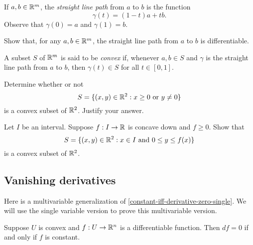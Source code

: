 \begin{definition} \label{straight-line-path}
	If $a, b \in \mathbb{R}^m$, the \emph{straight line path} from $a$ to $b$ is the function
	\[ \gamma(t) = (1-t)a + tb. \]
	Observe that $\gamma(0) = a$ and $\gamma(1) = b$. 
\end{definition}

\begin{exercise} \label{straight-line-path-differentiable}
	Show that, for any $a, b \in \mathbb{R}^m$, the straight line path from $a$ to $b$ is differentiable. 
\end{exercise}

\begin{definition} \label{convex}
	A subset $S$ of $\mathbb{R}^m$ is said to be \emph{convex} if, whenever $a, b \in S$ and $\gamma$ is the straight line path from $a$ to $b$, then $\gamma(t) \in S$ for all $t \in [0,1]$. 
\end{definition}

\begin{exercise}
	Determine whether or not
	\[ S = \{ (x, y) \in \mathbb{R}^2 : x \geq 0 \text{ or } y \neq 0 \} \]
	is a convex subset of $\mathbb{R}^2$. Justify your answer. 
\end{exercise}

\begin{exercise}
	Let $I$ be an interval. Suppose $f : I \to \mathbb{R}$ is concave down and $f \geq 0$. Show that
	\[ S = \{ (x, y) \in \mathbb{R}^2 : x \in I \text{ and } 0 \leq y \leq f(x) \} \]
	is a convex subset of $\mathbb{R}^2$. 
\end{exercise}

\subsection{Vanishing derivatives}

Here is a multivariable generalization of \cref{constant-iff-derivative-zero-single}. We will use the single variable version to prove this multivariable version. 

\begin{proposition} \label{constant-iff-derivative-zero}
	Suppose $U$ is convex and $f : U \to \mathbb{R}^n$ is a differentiable function. Then $df = 0$ if and only if $f$ is constant.  
\end{proposition}

